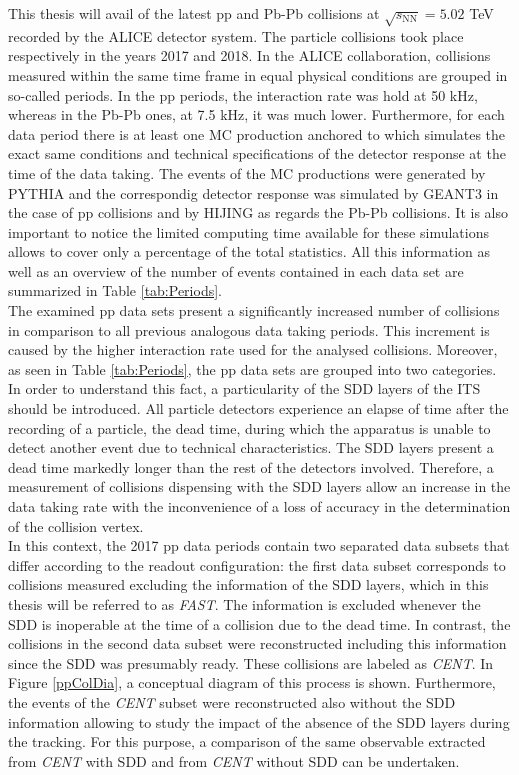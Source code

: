 \documentclass[12pt,a4paper]{report}
\begin{document}
This thesis will avail of the latest pp and Pb-Pb collisions at $\sqrt{s_\text{NN}}= 5.02$ TeV recorded by the ALICE detector system. The particle collisions took place respectively in the years 2017 and 2018. In the ALICE collaboration, collisions measured within the same time frame in equal physical conditions are grouped in so-called periods. In the pp periods, the interaction rate was hold at 50 kHz, whereas in the Pb-Pb ones, at 7.5 kHz, it was much lower. Furthermore, for each data period there is at least one MC production anchored to which simulates the exact same conditions and technical specifications of the detector response at the time of the data taking. The events of the MC productions were generated by PYTHIA and the correspondig detector response was simulated by GEANT3 in the case of pp collisions and by HIJING as regards the Pb-Pb collisions. It is also important to notice the limited computing time available for these simulations allows to cover only a percentage of the total statistics. All this information as well as an overview of the number of events contained in each data set are summarized in Table \ref{tab:Periods}. \\
The examined pp data sets present a significantly increased number of collisions in comparison to all previous analogous data taking periods. This increment is caused by the higher interaction rate used for the analysed collisions. Moreover, as seen in Table \ref{tab:Periods}, the pp data sets are grouped into two categories. In order to understand this fact, a particularity of the SDD layers of the ITS should be introduced. All particle detectors experience an elapse of time after the recording of a particle, the dead time, during which the apparatus is unable to detect another event due to technical characteristics. The SDD layers present a dead time markedly longer than the rest of the detectors involved. Therefore, a measurement of collisions dispensing with the SDD layers allow an increase in the data taking rate with the inconvenience of a loss of accuracy in the determination of the collision vertex. \\
In this context, the 2017 pp data periods contain two separated data subsets that differ according to the readout configuration: the first data subset corresponds to collisions measured excluding the information of the SDD layers, which in this thesis will be referred to as \textit{FAST}. The information is excluded whenever the SDD is inoperable at the time of a collision due to the dead time. In contrast, the collisions in the second data subset were reconstructed  including this information since the SDD was presumably ready. These collisions are labeled as \textit{CENT}. In Figure \ref{ppColDia}, a conceptual diagram of this process is shown. Furthermore, the events of the \textit{CENT} subset were reconstructed also without the SDD information allowing to study the impact of the absence of the SDD layers during the tracking. For this purpose, a comparison of the same observable extracted from \textit{CENT} with SDD and from \textit{CENT} without SDD can be undertaken. \\
\end{document}
